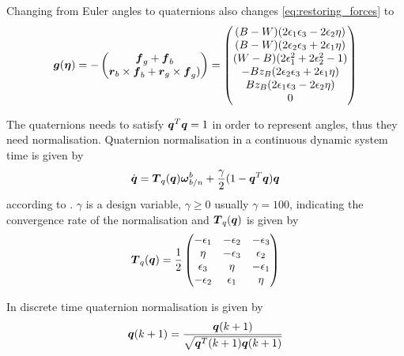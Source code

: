 Changing from Euler angles to quaternions also changes \eqref{eq:restoring_forces} to 
\begin{equation}
    \boldsymbol{g}(\boldsymbol{\eta}) = -
    \begin{pmatrix}
    \boldsymbol{f}_g + \boldsymbol{f}_b \\
    \boldsymbol{r}_b \times \boldsymbol{f}_b + \boldsymbol{r}_g \times \boldsymbol{f}_g) 
     \end{pmatrix} = 
    \begin{pmatrix}
	(B - W) (2 \epsilon_1 \epsilon_3 - 2 \epsilon_2 \eta) 	\\
    (B - W) (2 \epsilon_2 \epsilon_3 + 2 \epsilon_1 \eta) 	\\
 	(W - B)(2 \epsilon_1^2 + 2\epsilon_2^2 - 1)				\\
 	-B z_B (2 \epsilon_2 \epsilon_3 + 2 \epsilon_1 \eta)	\\
  	B z_B (2 \epsilon_1 \epsilon_3 - 2 \epsilon_2 \eta)		\\
    0
    \end{pmatrix}
\end{equation}

The quaternions needs to satisfy $\boldsymbol{q}^T\boldsymbol{q} = 1$ in order to represent angles, thus they need normalisation.
Quaternion normalisation in a continuous dynamic system time is given by 
\begin{equation}
\dot{\boldsymbol{q}} = \boldsymbol{T}_q(\boldsymbol{q}) \boldsymbol{\omega}^b_{b/n} + \frac{\gamma}{2} ( 1 - \boldsymbol{q}^T\boldsymbol{q})\boldsymbol{q}
\end{equation}
according to \citet[31]{fossen2011}. $\gamma$ is a design variable, $\gamma \geq 0$ usually $\gamma = 100$, indicating the convergence rate of the normalisation and $\boldsymbol{T}_q(\boldsymbol{q})$ is given by
\begin{equation} \label{eq:Tquat}
\boldsymbol{T}_q(\boldsymbol{q}) = \frac{1}{2}
\begin{pmatrix}
-\epsilon_1  & -\epsilon_2  & -\epsilon_3 \\
\eta   & -\epsilon_3 & \epsilon_2 \\
\epsilon_3 & \eta    &  -\epsilon_1 \\
-\epsilon_2 & \epsilon_1    & \eta \\
\end{pmatrix}
\end{equation}

In discrete time quaternion normalisation is given by 
\begin{equation}
\boldsymbol{q}(k+1) = \frac{\boldsymbol{q}(k+1)}{\sqrt{\boldsymbol{q}^T(k+1)\boldsymbol{q}(k+1)}}
\end{equation}

